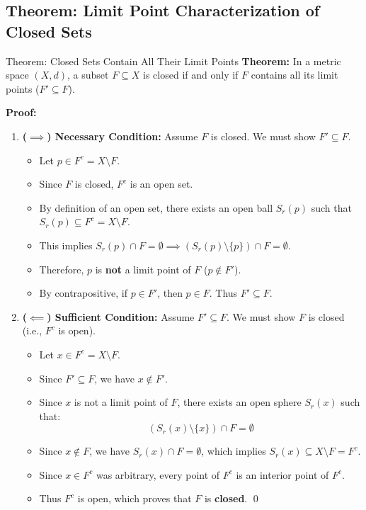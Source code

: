 \documentclass[11pt,a4paper]{article}
\begin{document}
\subsection{Theorem: Limit Point Characterization of Closed Sets}

\begin{exbox}{Theorem: Closed Sets Contain All Their Limit Points}
\textbf{Theorem:} In a metric space $(X, d)$, a subset $F \subseteq X$ is closed if and only if $F$ contains all its limit points ($F' \subseteq F$).

\textbf{Proof:}
\begin{enumerate}
    \item \textbf{($\implies$) Necessary Condition:} Assume $F$ is closed. We must show $F' \subseteq F$.
    \begin{itemize}
        \item Let $p \in F^c = X \setminus F$.
        \item Since $F$ is closed, $F^c$ is an open set.
        \item By definition of an open set, there exists an open ball $S_r(p)$ such that $S_r(p) \subseteq F^c = X \setminus F$.
        \item This implies $S_r(p) \cap F = \emptyset \implies (S_r(p) \setminus \{p\}) \cap F = \emptyset$.
        \item Therefore, $p$ is \textbf{not} a limit point of $F$ ($p \notin F'$).
        \item By contrapositive, if $p \in F'$, then $p \in F$. Thus $F' \subseteq F$.
    \end{itemize}
    
    \item \textbf{($\impliedby$) Sufficient Condition:} Assume $F' \subseteq F$. We must show $F$ is closed (i.e., $F^c$ is open).
    \begin{itemize}
        \item Let $x \in F^c = X \setminus F$.
        \item Since $F' \subseteq F$, we have $x \notin F'$.
        \item Since $x$ is not a limit point of $F$, there exists an open sphere $S_r(x)$ such that:
        $$(S_r(x) \setminus \{x\}) \cap F = \emptyset$$
        \item Since $x \notin F$, we have $S_r(x) \cap F = \emptyset$, which implies $S_r(x) \subseteq X \setminus F = F^c$.
        \item Since $x \in F^c$ was arbitrary, every point of $F^c$ is an interior point of $F^c$.
        \item Thus $F^c$ is open, which proves that $F$ is \textbf{closed}. \qed
    \end{itemize}
\end{enumerate}
\end{exbox}
\end{document}
